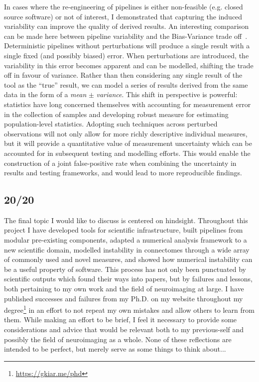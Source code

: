 In cases where the re-engineering of pipelines is either non-feasible (e.g. closed source software) or not of
interest, I demonstrated that capturing the induced variability can improve the quality of derived results. An
interesting comparison can be made here between pipeline variability and the Bias-Variance trade
off~\cite{jain2000statistical}. Deterministic pipelines without perturbations will produce a single result with a
single fixed (and possibly biased) error. When perturbations are introduced, the variability in this error becomes
apparent and can be modelled, shifting the trade off in favour of variance. Rather than then considering any single
result of the tool as the ``true'' result, we can model a series of results derived from the same data in the form
of a \textit{mean} $\pm$ \textit{variance}. This shift in perspective is powerful: statistics have long concerned
themselves with accounting for measurement error in the collection of samples and developing robust measure for
estimating population-level statistics. Adopting such techniques across perturbed observations will not only allow
for more richly descriptive individual measures, but it will provide a quantitative value of measurement uncertainty
which can be accounted for in subsequent testing and modelling efforts. This would enable the construction of a
joint false-positive rate when combining the uncertainty in results and testing frameworks, and would lead to more
reproducible findings.

\subsection{20/20}
The final topic I would like to discuss is centered on hindsight. Throughout this project I have developed tools
for scientific infrastructure, built pipelines from modular pre-existing components, adapted a numerical analysis
framework to a new scientific domain, modelled instability in connectomes through a wide array of commonly used
and novel measures, and showed how numerical instability can be a useful property of software. This process has not
only been punctuated by scientific outputs which found their ways into papers, but by failures and lessons, both
pertaining to my own work and the field of neuroimaging at large. I have published successes and failures from my
Ph.D. on my website throughout my degree\footnote{\url{https://gkiar.me/phd}} in an effort to not repeat my own
mistakes and allow others to learn from them. While making an effort to be brief, I feel it necessary to provide
some considerations and advice that would be relevant both to my previous-self and possibly the field of
neuroimaging as a whole. None of these reflections are intended to be perfect, but merely serve as some things to
think about...

